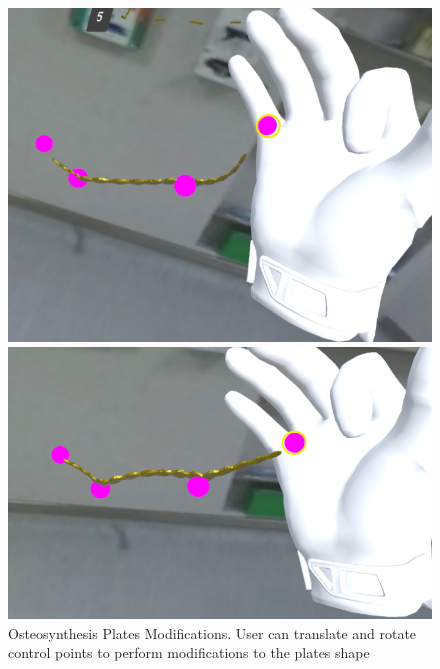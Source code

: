 \begin{figure}
  \centering
  \begin{minipage}{.5\textwidth}
    \centering
    \includegraphics[width=0.95\linewidth]{images/implementation/features/procedures/metal_plates_2.png}
  \end{minipage}%
  \begin{minipage}{.5\textwidth}
    \centering
    \includegraphics[width=0.95\linewidth]{images/implementation/features/procedures/metal_plates_3.png}
  \end{minipage}
  \caption{\label{fig::FeatureMetalPlate2}Osteosynthesis Plates Modifications. User can translate and rotate control points to perform modifications to the plates shape} 
\end{figure}


